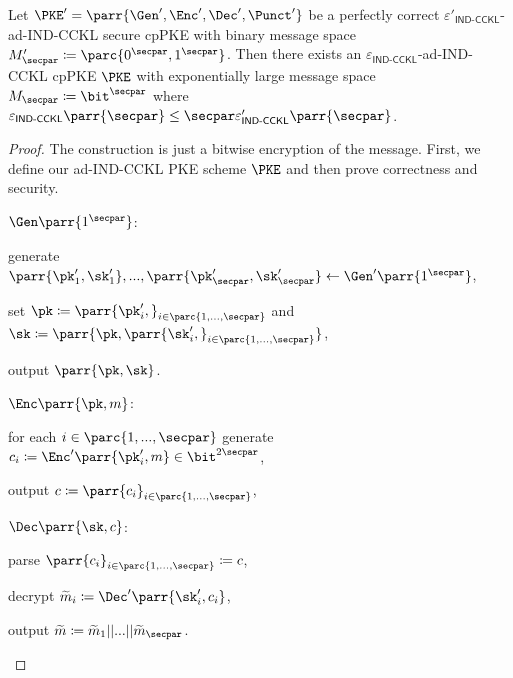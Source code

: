 \begin{theorem}
    Let \(\PKE' = \parr{\Gen',\Enc',\Dec',\Punct'}\) be a perfectly correct \(\varepsilon'_{\textsf{IND-CCKL}}\)-ad-IND-CCKL secure cpPKE with binary message space \(M'_\secpar \coloneq \parc{0^\secpar,1^\secpar}\).
    Then there exists an \(\varepsilon_{\textsf{IND-CCKL}}\)-ad-IND-CCKL cpPKE \(\PKE\) with exponentially large message space \(M_\secpar \coloneq \bit^\secpar\) where \(\varepsilon_{\textsf{IND-CCKL}}\parr{\secpar} \leq \secpar \varepsilon'_{\textsf{IND-CCKL}}\parr{\secpar}\).
\end{theorem}

\begin{proof}
    The construction is just a bitwise encryption of the message.
    First, we define our ad-IND-CCKL PKE scheme \(\PKE\) and then prove correctness and security.
    \begin{sitemize}
        \item \(\Gen\parr{1^\secpar}\):
        \begin{sitemize}
            \item generate \(\parr{\pk'_1,\sk'_1}, ..., \parr{\pk'_\secpar,\sk'_\secpar} \gets \Gen'\parr{1^{\secpar}}\),
            \item set \(\pk \coloneqq \parr{\pk'_i,}_{i \in \parc{1,...,\secpar}}\) and \(\sk \coloneqq \parr{\pk,\parr{\sk'_i,}_{i \in \parc{1,...,\secpar}}}\),
            \item output \(\parr{\pk,\sk}\).
        \end{sitemize}

        \item \(\Enc\parr{\pk,m}\):
        \begin{sitemize}
            \item for each \(i \in \parc{1,...,\secpar}\) generate \(c_i \coloneqq \Enc'\parr{\pk'_i,m} \in \bit^{2\secpar}\),
            \item output \(c \coloneqq \parr{c_i}_{i \in \parc{1,...,\secpar}}\),
        \end{sitemize}

        \item \(\Dec\parr{\sk,c}\):
        \begin{sitemize}
            \item parse \(\parr{c_i}_{i \in \parc{1,...,\secpar}} \coloneqq c\),
            \item decrypt \(\widetilde{m}_i \coloneqq \Dec'\parr{\sk'_i,c_i}\),
            \item output \(\widetilde{m} \coloneqq \widetilde{m}_1||...||\widetilde{m}_\secpar\).
        \end{sitemize}


\end{sitemize}
\end{proof}
